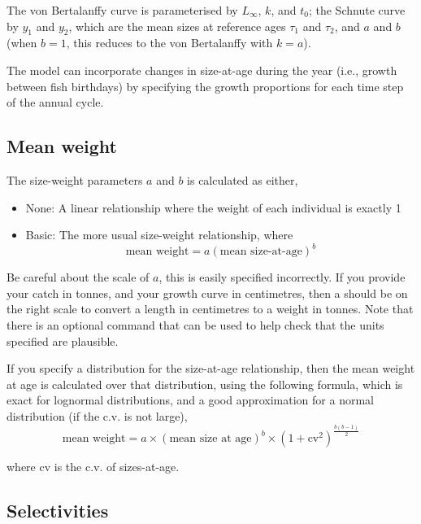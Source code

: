 The von Bertalanffy curve is parameterised by $L_\infty$, $k$, and $t_0$; the Schnute curve \citep{836} by $y_1$ and $y_2$, which are the mean sizes at reference ages $\tau_1$ and $\tau_2$, and $a$ and $b$ (when $b=1$, this reduces to the von Bertalanffy with $k=a$). 

The model can incorporate changes in size-at-age during the year (i.e., growth between fish birthdays) by specifying the growth proportions for each time step of the annual cycle.

\subsection{Mean weight\label{sec:mean-weight}}

The size-weight parameters $a$ and $b$ is calculated as either,
\begin{itemize}
  \item{None:} A linear relationship where the weight of each individual is exactly 1 
  \item{Basic:} The more usual size-weight relationship, where 
  \begin{equation}
    \text{mean weight}=a(\text{mean size-at-age})^b
  \end{equation}
\end{itemize}
  
Be careful about the scale of $a$, \textemdash this is easily specified incorrectly. If you provide your catch in tonnes, and your growth curve in centimetres, then a should be on the right scale to convert a length in centimetres to a weight in tonnes. Note that there is an optional command  that can be used to help check that the units specified are plausible.

If you specify a distribution for the size-at-age relationship, then the mean weight at age is calculated over that distribution, using the following formula, which is exact for lognormal distributions, and a good approximation for a normal distribution (if the c.v. is not large),
\begin{equation}
	\text{mean weight}=a \times (\text{mean size at age})^b \times \left( 1+\text{cv}^2 \right)^{\frac{b(b-1)}{2}}
\end{equation}

where cv is the c.v. of sizes-at-age.

\subsection{Selectivities\label{sec:selectivities}}

